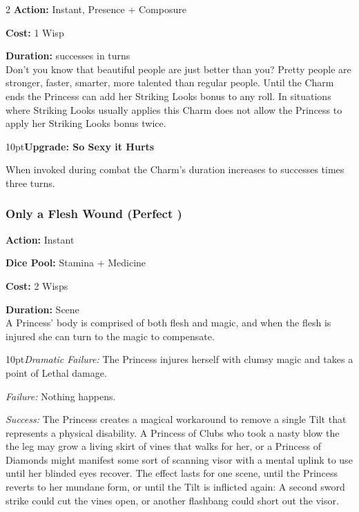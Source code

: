 \begin{multicols}{2}
\noindent \textbf{Action:} Instant, Presence + Composure

\noindent \textbf{Cost:} 1 Wisp

\noindent \textbf{Duration:} successes in turns \\

\noindent Don't you know that beautiful people are just better than you? Pretty people are stronger, faster, smarter, more talented than regular people. Until the Charm ends the Princess can add her Striking Looks bonus to any roll. In situations where Striking Looks usually applies this Charm does not allow the Princess to apply her Striking Looks bonus twice.

\begin{myindentpar}{10pt}\textbf{Upgrade: So Sexy it Hurts}

When invoked during combat the Charm's duration increases to successes times three turns.\end{myindentpar}

\subsubsection*{Only a Flesh Wound (Perfect \textbullet\textbullet)}

\noindent \textbf{Action:} Instant

\noindent \textbf{Dice Pool:} Stamina + Medicine

\noindent \textbf{Cost:} 2 Wisps 

\noindent \textbf{Duration:} Scene \\

\noindent A Princess' body is comprised of both flesh and magic, and when the flesh is injured she can turn to the magic to compensate. 

\begin{myindentpar}{10pt}\emph{Dramatic Failure:} The Princess injures herself with clumsy magic and takes a point of Lethal damage. 
 
\emph{Failure:} Nothing happens. 

\emph{Success:} The Princess creates a magical workaround to remove a single Tilt that represents a physical disability. A Princess of Clubs who took a nasty blow the the leg may grow a living skirt of vines that walks for her, or a Princess of Diamonds might manifest some sort of scanning visor with a mental uplink to use until her blinded eyes recover. The effect lasts for one scene, until the Princess reverts to her mundane form, or until the Tilt is inflicted again: A second sword strike could cut the vines open, or another flashbang could short out the visor. 


\end{myindentpar}
\end{multicols}

